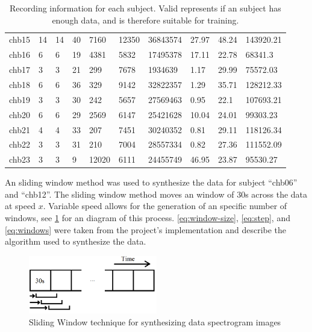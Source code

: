 \documentclass[12pt]{article}
\begin{document}
\begin{table}[H]
\begin{center}
\begin{tabular}{l|lll|lll|lll}
chb15 & 14        & 14      & 40        & 7160    & 12350   & 36843574    & 27.97     & 48.24     & 143920.21    \\
chb16 & 6         & 6       & 19        & 4381    & 5832    & 17495378    & 17.11     & 22.78     & 68341.3      \\
chb17 & 3         & 3       & 21        & 299     & 7678    & 1934639     & 1.17      & 29.99     & 75572.03     \\
chb18 & 6         & 6       & 36        & 329     & 9142    & 32822357    & 1.29      & 35.71     & 128212.33    \\
chb19 & 3         & 3       & 30        & 242     & 5657    & 27569463    & 0.95      & 22.1      & 107693.21    \\
chb20 & 6         & 6       & 29        & 2569    & 6147    & 25421628    & 10.04     & 24.01     & 99303.23     \\
chb21 & 4         & 4       & 33        & 207     & 7451    & 30240352    & 0.81      & 29.11     & 118126.34    \\
chb22 & 3         & 3       & 31        & 210     & 7004    & 28557334    & 0.82      & 27.36     & 111552.09    \\
chb23 & 3         & 3       & 9         & 12020   & 6111    & 24455749    & 46.95     & 23.87     & 95530.27    
\end{tabular}
\caption{Recording information for each subject. Valid represents if an subject has enough data, and is therefore suitable for training.}
\label{tab:class-size}
\end{center}
\end{table}


An sliding window method was used to synthesize the data for subject ``chb06'' and ``chb12''. The sliding window method moves an window of 30s across the data at speed $x$. Variable speed allows for the generation of an specific number of windows, see \ref{fig:slidingWindow} for an diagram of this process. \ref{eq:window-size}, \ref{eq:step}, and \ref{eq:windows} were taken from the project's implementation and describe the algorithm used to synthesize the data. 

\begin{figure}[H]
\includegraphics[width=0.5\textwidth]{slidingWindow}
\centering
\caption{Sliding Window technique for synthesizing data spectrogram images}
\label{fig:slidingWindow}
\end{figure}
\end{document}
